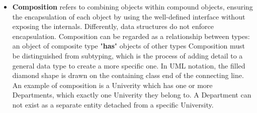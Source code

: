 \begin{itemize}
              It represents a part-whole or a part-of relationship. 
              As a type of association, an aggregation can be named and 
              have the same adornments an association can.
              \newline
              An aggregation can occur when a class is a collection or 
              a container of other classes, but the contained classed 
              do not have a strong lifecycle dependency on the 
              container. \textbf{The content of the container continues 
              to exist when the container is destroyed}.
              \newline
              In UML notation, the hollow diamond shape is drawn on the 
              containing class end of the connecting line. An example of 
              aggregarion is a Pond which has zero or more Ducks 
              and Duck which has at most one Pond. Duck can exist 
              separately from a pond.
        \item \textbf{Composition} refers to combining objects within 
              compound objects, ensuring the encapsulation of each 
              object by using the well-defined interface without 
              exposing the internals. Differently, data structures do 
              not enforce encapsulation.
              \newline
              Composition can be regarded as a relationship between 
              types: an object of composite type "\textbf{has}" objects 
              of other types
              \newline
              Composition must be distinguished from subtyping, which 
              is the process of adding detail to a general data type 
              to create a more specific one.
              \newline
              In UML notation, the filled diamond shape is drawn on the 
              containing class end of the connecting line. An example of 
              composition is a Univerity which has one or more 
              Departments, which exactly one Univerity they belong 
              to. A Department can not exist as a separate entity 
              detached from a specific University.
    \end{itemize}

